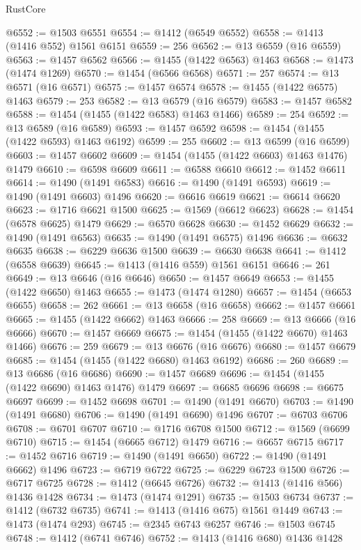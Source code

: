 \begin{lexlean}{RustCore}
\begin{coremodule}
@6552 := @1503 @6551
@6554 := @1412 (@6549 @6552)
@6558 := @1413 (@1416 @552) @1561 @6151
@6559 := 256
@6562 := @13 @6559 (@16 @6559)
@6563 := @1457 @6562
@6566 := @1455 (@1422 @6563) @1463
@6568 := @1473 (@1474 @1269)
@6570 := @1454 (@6566 @6568)
@6571 := 257
@6574 := @13 @6571 (@16 @6571)
@6575 := @1457 @6574
@6578 := @1455 (@1422 @6575) @1463
@6579 := 253
@6582 := @13 @6579 (@16 @6579)
@6583 := @1457 @6582
@6588 := @1454 (@1455 (@1422 @6583) @1463 @1466)
@6589 := 254
@6592 := @13 @6589 (@16 @6589)
@6593 := @1457 @6592
@6598 := @1454 (@1455 (@1422 @6593) @1463 @6192)
@6599 := 255
@6602 := @13 @6599 (@16 @6599)
@6603 := @1457 @6602
@6609 := @1454 (@1455 (@1422 @6603) @1463 @1476) @1479
@6610 := @6598 @6609
@6611 := @6588 @6610
@6612 := @1452 @6611
@6614 := @1490 (@1491 @6583)
@6616 := @1490 (@1491 @6593)
@6619 := @1490 (@1491 @6603) @1496
@6620 := @6616 @6619
@6621 := @6614 @6620
@6623 := @1716 @6621 @1500
@6625 := @1569 (@6612 @6623)
@6628 := @1454 (@6578 @6625) @1479
@6629 := @6570 @6628
@6630 := @1452 @6629
@6632 := @1490 (@1491 @6563)
@6635 := @1490 (@1491 @6575) @1496
@6636 := @6632 @6635
@6638 := @6229 @6636 @1500
@6639 := @6630 @6638
@6641 := @1412 (@6558 @6639)
@6645 := @1413 (@1416 @559) @1561 @6151
@6646 := 261
@6649 := @13 @6646 (@16 @6646)
@6650 := @1457 @6649
@6653 := @1455 (@1422 @6650) @1463
@6655 := @1473 (@1474 @1280)
@6657 := @1454 (@6653 @6655)
@6658 := 262
@6661 := @13 @6658 (@16 @6658)
@6662 := @1457 @6661
@6665 := @1455 (@1422 @6662) @1463
@6666 := 258
@6669 := @13 @6666 (@16 @6666)
@6670 := @1457 @6669
@6675 := @1454 (@1455 (@1422 @6670) @1463 @1466)
@6676 := 259
@6679 := @13 @6676 (@16 @6676)
@6680 := @1457 @6679
@6685 := @1454 (@1455 (@1422 @6680) @1463 @6192)
@6686 := 260
@6689 := @13 @6686 (@16 @6686)
@6690 := @1457 @6689
@6696 := @1454 (@1455 (@1422 @6690) @1463 @1476) @1479
@6697 := @6685 @6696
@6698 := @6675 @6697
@6699 := @1452 @6698
@6701 := @1490 (@1491 @6670)
@6703 := @1490 (@1491 @6680)
@6706 := @1490 (@1491 @6690) @1496
@6707 := @6703 @6706
@6708 := @6701 @6707
@6710 := @1716 @6708 @1500
@6712 := @1569 (@6699 @6710)
@6715 := @1454 (@6665 @6712) @1479
@6716 := @6657 @6715
@6717 := @1452 @6716
@6719 := @1490 (@1491 @6650)
@6722 := @1490 (@1491 @6662) @1496
@6723 := @6719 @6722
@6725 := @6229 @6723 @1500
@6726 := @6717 @6725
@6728 := @1412 (@6645 @6726)
@6732 := @1413 (@1416 @566) @1436 @1428
@6734 := @1473 (@1474 @1291)
@6735 := @1503 @6734
@6737 := @1412 (@6732 @6735)
@6741 := @1413 (@1416 @675) @1561 @1449
@6743 := @1473 (@1474 @293)
@6745 := @2345 @6743 @6257
@6746 := @1503 @6745
@6748 := @1412 (@6741 @6746)
@6752 := @1413 (@1416 @680) @1436 @1428

\end{coremodule}
\end{lexlean}
